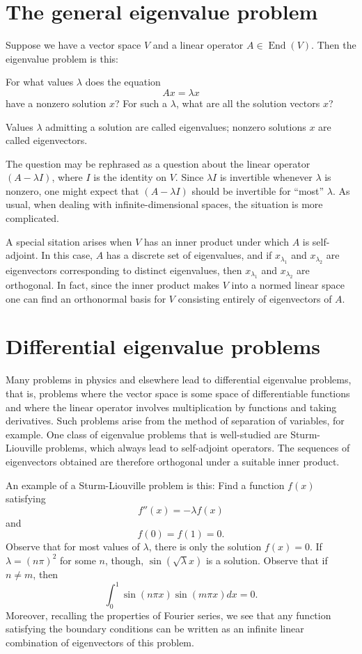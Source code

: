 \documentclass[12pt]{article}
\begin{document}
\section*{The general eigenvalue problem}

Suppose we have a vector space $V$ and a linear operator
$A\in\operatorname{End}(V)$.  Then the eigenvalue problem is this:

For what values $\lambda$ does the equation
\[
Ax = \lambda x
\]
have a nonzero solution $x$?  For such a $\lambda$, what are all the
solution vectors $x$?

Values $\lambda$ admitting a solution are called eigenvalues; nonzero
solutions $x$ are called eigenvectors.

The question may be rephrased as a question about the linear operator
$(A-\lambda I)$, where $I$ is the identity on $V$.  Since $\lambda I$
is invertible whenever $\lambda$ is nonzero, one might expect that
$(A-\lambda I)$ should be invertible for ``most'' $\lambda$.  As
usual, when dealing with infinite-dimensional spaces, the situation is
more complicated.

A special sitation arises when $V$ has an inner product under which
$A$ is self-adjoint.  In this case, $A$ has a discrete set of
eigenvalues, and if $x_{\lambda_1}$ and $x_{\lambda_2}$ are
eigenvectors corresponding to distinct eigenvalues, then
$x_{\lambda_1}$ and $x_{\lambda_2}$ are orthogonal.  In fact, since
the inner product makes $V$ into a normed linear space one can find an
orthonormal basis for $V$ consisting entirely of eigenvectors of $A$.

\section*{Differential eigenvalue problems}

Many problems in physics and elsewhere lead to differential eigenvalue problems, that is, problems where the vector space is some space of differentiable functions and where the linear operator involves multiplication by functions and taking derivatives.  Such problems arise from the method of separation of variables, for example.  One class of eigenvalue problems that is well-studied are Sturm-Liouville problems, which always lead to self-adjoint operators.  The sequences of eigenvectors obtained are therefore orthogonal under a suitable inner product.  

An example of a Sturm-Liouville problem is this: Find a function $f(x)$ satisfying
\[
f''(x) = -\lambda f(x) 
\]
and
\[
f(0)=f(1)=0.
\]
Observe that for most values of $\lambda$, there is only the solution $f(x)=0$.  If $\lambda=(n\pi)^2$ for some $n$, though, $\sin(\sqrt{\lambda}x)$ is a solution.  Observe that if $n\neq m$, then
\[
\int_0^1 \sin(n\pi x)\sin(m\pi x) dx = 0.
\]
Moreover, recalling the properties of Fourier series, we see that any function satisfying the boundary conditions can be written as an infinite linear combination of eigenvectors of this problem.
\end{document}
